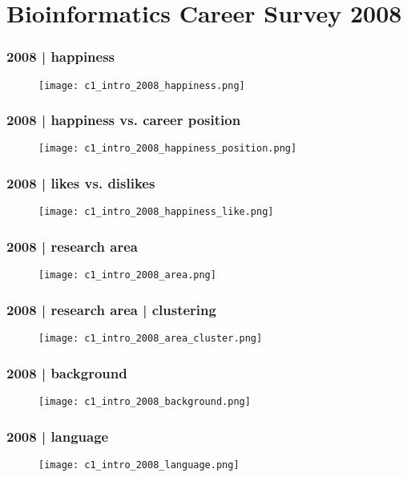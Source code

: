 \section{Bioinformatics Career Survey 2008}
\begin{frame}
  \frametitle{2008 | happiness}
   \begin{figure}
     \centering
     \texttt{[image: c1\_intro\_2008\_happiness.png]}
   \end{figure}
\end{frame}

\begin{frame}
  \frametitle{2008 | happiness vs. career position}
   \begin{figure}
     \centering
     \texttt{[image: c1\_intro\_2008\_happiness\_position.png]}
   \end{figure}
\end{frame}

\begin{frame}
  \frametitle{2008 | likes vs. dislikes}
   \begin{figure}
     \centering
     \texttt{[image: c1\_intro\_2008\_happiness\_like.png]}
   \end{figure}
\end{frame}

\begin{frame}
  \frametitle{2008 | research area}
   \begin{figure}
     \centering
     \texttt{[image: c1\_intro\_2008\_area.png]}
   \end{figure}
\end{frame}

\begin{frame}
  \frametitle{2008 | research area | clustering}
   \begin{figure}
     \centering
     \texttt{[image: c1\_intro\_2008\_area\_cluster.png]}
   \end{figure}
\end{frame}

\begin{frame}
  \frametitle{2008 | background}
   \begin{figure}
     \centering
     \texttt{[image: c1\_intro\_2008\_background.png]}
   \end{figure}
\end{frame}

\begin{frame}
  \frametitle{2008 | language}
   \begin{figure}
     \centering
     \texttt{[image: c1\_intro\_2008\_language.png]}
   \end{figure}
\end{frame}

